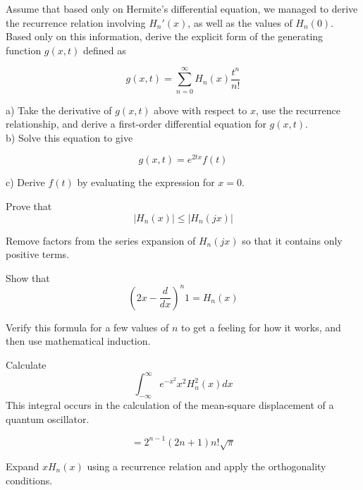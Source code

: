 \pagebreak

\begin{exer}
Assume that based only on Hermite's differential equation, we managed to derive the recurrence relation involving $H_n'(x)$, as well as the values of $H_n(0)$. Based only on this information, derive the explicit form of the generating function $g(x,t)$ defined as

$$g(x,t) = \sum_{n = 0}^{\infty} H_n(x)\frac{t^n}{n!} $$

a) Take the derivative of $g(x,t)$ above with respect to $x$, use the recurrence relationship, and derive a first-order differential equation for $g(x,t)$.\\

b) Solve this equation to give

$$g(x,t) = e^{2tx} f(t)$$

c) Derive $f(t)$ by evaluating the expression for $x=0$.
\end{exer}

\begin{exer}
Prove that 
$$ | H_n(x) | \le  | H_n(jx) | $$
\begin{hnt}
  Remove factors from the series expansion of $ H_n(jx) $ so that it contains only positive terms.
\end{hnt}
\end{exer}


\begin{exer}
Show that 
$$\left( 2x - \frac{d}{dx} \right)^n 1 = H_n(x)$$
\begin{hnt}
  Verify this formula for a few values of $n$ to get a feeling for how it works, and then use mathematical induction.
\end{hnt}
\end{exer}


\begin{exer}
Calculate
$$ \int_{-\infty}^{\infty} e^{-x^2} x^2 H_n^2(x) dx $$
This integral occurs in the calculation of the mean-square displacement of a quantum oscillator.
\begin{sol}
$$ = 2^{n-1} (2n + 1) n! \sqrt{\pi}$$
\end{sol}
\begin{hnt}
Expand $x H_n(x)$ using a recurrence relation and apply the orthogonality conditions.
\end{hnt}  
\end{exer}

